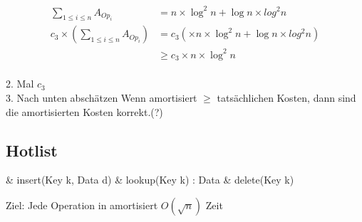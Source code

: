 \documentclass[a4paper]{scrartcl}
\begin{document}
			\begin{align}
				\sum_{1\leq i \leq n} A_{Op_i} &= n \times \log^2 n + \log n \times log^2 n\\
				c_3 \times (\sum_{1\leq i \leq n} A_{Op_i}) &= c_3 ( \times n \times \log^2 n + \log n \times log^2 n)\\
				& \geq c_3 \times n \times \log^2 n\\
			\end{align}
			
				2. Mal \(c_3\)\\
				3. Nach unten abschätzen
				Wenn amortisiert \( \geq \) tatsächlichen Kosten, dann sind die amortisierten Kosten korrekt.(?)
			
			\subsection{Hotlist}
			\begin{easylist}
				& insert(Key k, Data d)
				& lookup(Key k) : Data
				& delete(Key k)
			\end{easylist}
			
			Ziel: Jede Operation in amortisiert \(O(\sqrt{n}) \) Zeit
			
\end{document}
